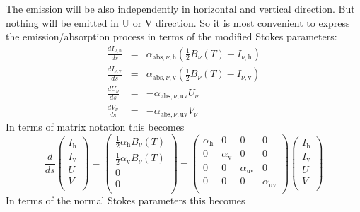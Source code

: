\documentclass{report}
\begin{document}
The emission will be also independently in horizontal and vertical
direction. But nothing will be emitted in U or V direction. So it is most
convenient to express the emission/absorption process in terms of the
modified Stokes parameters:
\begin{eqnarray}
\frac{dI_{\nu,\mathrm{h}}}{ds} &=& \alpha_{\mathrm{abs},\nu,\mathrm{h}} (\frac{1}{2}B_\nu(T)-I_{\nu,\mathrm{h}}) \\
\frac{dI_{\nu,\mathrm{v}}}{ds} &=& \alpha_{\mathrm{abs},\nu,\mathrm{v}} (\frac{1}{2}B_\nu(T)-I_{\nu,\mathrm{v}}) \\
\frac{dU_{\nu}}{ds} &=& -\alpha_{\mathrm{abs},\nu,\mathrm{uv}} U_{\nu} \\
\frac{dV_{\nu}}{ds} &=& -\alpha_{\mathrm{abs},\nu,\mathrm{uv}} V_{\nu}
\end{eqnarray}
In terms of matrix notation this becomes
\begin{equation}\label{eq-formal-rt-emisabs-in-rotated-system}
\frac{d}{ds}
\left(\begin{matrix}
I_{\mathrm{h}} \\
I_{\mathrm{v}} \\
U \\
V \\
\end{matrix}\right)
= \left(\begin{matrix}
\tfrac{1}{2}\alpha_{\mathrm{h}} B_\nu(T) \\
\tfrac{1}{2}\alpha_{\mathrm{v}} B_\nu(T) \\
0 \\
0 \\
\end{matrix}\right)
- 
\left(\begin{matrix}
\alpha_{\mathrm{h}} & 0 & 0 & 0 \\
0 & \alpha_{\mathrm{v}} & 0 & 0  \\
0 & 0 & \alpha_{\mathrm{uv}} & 0 \\
0 & 0 & 0 & \alpha_{\mathrm{uv}} \\
\end{matrix}\right)
\left(\begin{matrix}
I_{\mathrm{h}} \\
I_{\mathrm{v}} \\
U \\
V \\
\end{matrix}\right)
\end{equation}
In terms of the normal Stokes parameters this becomes
\end{document}
